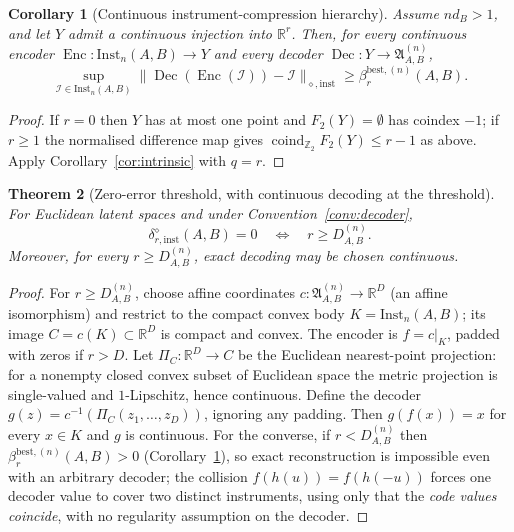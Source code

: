 \documentclass[11pt,a4paper]{article}
\newtheorem{theorem}{Theorem}[section]
\newtheorem{corollary}[theorem]{Corollary}
\newcommand{\Inst}{\mathrm{Inst}}
\newcommand{\coind}{\operatorname{coind}_{\mathbb Z_2}}
\begin{document}
\begin{corollary}[Continuous instrument-compression hierarchy]
\label{cor:euclidean}
Assume $nd_B>1$, and let $Y$ admit a continuous injection into $\mathbb R^r$. Then, for every continuous encoder $\operatorname{Enc}:\Inst_n(A,B)\to Y$ and every decoder $\operatorname{Dec}:Y\to\mathfrak A_{A,B}^{(n)}$,
\[
\sup_{\mathcal I\in\Inst_n(A,B)}
\|\operatorname{Dec}(\operatorname{Enc}(\mathcal I))-\mathcal I\|_{\diamond,\mathrm{inst}}
\ge\beta_r^{\mathrm{best},(n)}(A,B).
\]
\end{corollary}

\begin{proof}
If $r=0$ then $Y$ has at most one point and $F_2(Y)=\emptyset$ has coindex $-1$; if $r\ge1$ the normalised difference map gives $\coind F_2(Y)\le r-1$ as above. Apply Corollary~\ref{cor:intrinsic} with $q=r$.
\end{proof}

\begin{theorem}[Zero-error threshold, with continuous decoding at the threshold]
\label{thm:zero-error}
For Euclidean latent spaces and under Convention~\ref{conv:decoder},
\[
\delta_{r,\mathrm{inst}}^{\diamond}(A,B)=0
\quad\Longleftrightarrow\quad
r\ge D_{A,B}^{(n)}.
\]
Moreover, for every $r\ge D_{A,B}^{(n)}$, exact decoding may be chosen continuous.
\end{theorem}

\begin{proof}
For $r\ge D_{A,B}^{(n)}$, choose affine coordinates $c:\mathfrak A_{A,B}^{(n)}\to\mathbb R^{D}$ (an affine isomorphism) and restrict to the compact convex body $K=\Inst_n(A,B)$; its image $C=c(K)\subset\mathbb R^{D}$ is compact and convex. The encoder is $f=c|_K$, padded with zeros if $r>D$. Let $\Pi_C:\mathbb R^{D}\to C$ be the Euclidean nearest-point projection: for a nonempty closed convex subset of Euclidean space the metric projection is single-valued and $1$-Lipschitz, hence continuous. Define the decoder $g(z)=c^{-1}(\Pi_C(z_1,\dots,z_D))$, ignoring any padding. Then $g(f(x))=x$ for every $x\in K$ and $g$ is continuous. For the converse, if $r<D_{A,B}^{(n)}$ then $\beta_r^{\mathrm{best},(n)}(A,B)>0$ (Corollary~\ref{cor:euclidean}), so exact reconstruction is impossible even with an arbitrary decoder; the collision $f(h(u))=f(h(-u))$ forces one decoder value to cover two distinct instruments, using only that the \emph{code values coincide}, with no regularity assumption on the decoder.
\end{proof}
\end{document}
